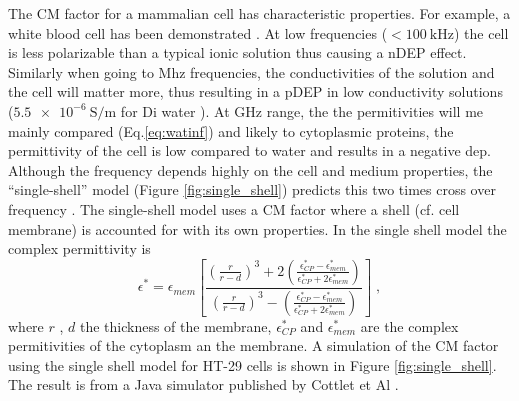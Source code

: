 \documentclass[draft]{jyflluk}
\begin{document}
The CM factor for a mammalian cell has characteristic properties. For example, a white blood cell has been demonstrated \cite{voldman_electrical_2006}. At low frequencies ($<\SI{100}{\kilo \Hz}$) the cell is less polarizable than a typical ionic solution thus causing a nDEP effect. Similarly when going to Mhz frequencies, the conductivities of the solution and the cell will matter more, thus resulting in a pDEP in low conductivity solutions ($\SI{5.5e-6}{ \siemens \per \metre}$ for Di water \cite{pashley2005gassed}). At GHz range, the the permitivities will me mainly compared (Eq.\ref{eq:watinf}) and likely to cytoplasmic proteins, the permittivity of the cell is low compared to water and results in a negative dep.  Although the frequency depends highly on the cell and medium properties, the “single-shell” model (Figure \ref{fig:single_shell}) predicts this two times cross over frequency \cite{cetin_dielectrophoresis_2011,pethig_review_2010, voldman_electrical_2006, cottet_mydep_2019}. The single-shell model uses a CM factor where a shell (cf. cell membrane) is accounted for with its own properties. In the single shell model the complex permittivity is
%
\begin{equation}
   \label{eq:shellmodel}
   \epsilon^*=\epsilon_{mem} \left[ \frac{\left( \frac{r}{r-d}\right)^3 + 2\left(\frac{\epsilon_{CP}^* - \epsilon_{mem}^*}{\epsilon_{CP}^* + 2\epsilon_{mem}^*} \right)}{\left( \frac{r}{r-d}\right)^3 -\left(\frac{\epsilon_{CP}^* - \epsilon_{mem}^*}{\epsilon_{CP}^* + 2\epsilon_{mem}^*} \right)}        \right] \;,
\end{equation}
%
where $r$ , $d$ the thickness of the membrane, $\epsilon_{CP}^*$ and  $\epsilon_{mem}^*$ are the complex permitivities of the cytoplasm an the membrane. A simulation of the CM factor using the single shell model for HT-29 cells is shown in Figure \ref{fig:single_shell}. The result is from a Java  simulator published by Cottlet et Al \cite{cottet_mydep_2019}.
\end{document}
